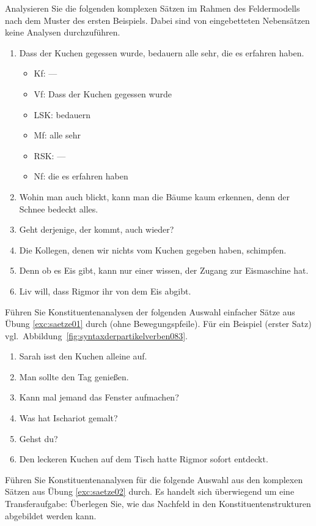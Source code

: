  \label{exc:saetze02} Analysieren Sie die folgenden komplexen Sätzen im Rahmen des Feldermodells nach dem Muster des ersten Beispiels.
Dabei sind von eingebetteten Nebensätzen keine Analysen durchzuführen.

\begin{enumerate}
  \item Dass der Kuchen gegessen wurde, bedauern alle sehr, die es erfahren haben.
    \begin{itemize}
      \item Kf: ---
      \item Vf: Dass der Kuchen gegessen wurde
      \item LSK: bedauern
      \item Mf: alle sehr
      \item RSK: ---
      \item Nf: die es erfahren haben
    \end{itemize}
  \item Wohin man auch blickt, kann man die Bäume kaum erkennen, denn der Schnee bedeckt alles.
  \item Geht derjenige, der kommt, auch wieder?
  \item Die Kollegen, denen wir nichts vom Kuchen gegeben haben, schimpfen.
  \item Denn ob es Eis gibt, kann nur einer wissen, der Zugang zur Eismaschine hat.
  \item Liv will, dass Rigmor ihr von dem Eis abgibt.
\end{enumerate}

 \label{exc:saetze03} Führen Sie Konstituentenanalysen der folgenden Auswahl einfacher Sätze aus Übung \ref{exc:saetze01} durch (ohne Bewegungspfeile).
Für ein Beispiel (erster Satz) vgl.\ Abbildung~\ref{fig:syntaxderpartikelverben083}.

\begin{enumerate}
  \item{Sarah isst den Kuchen alleine auf.}
  \item{Man sollte den Tag genießen.}
  \item{Kann mal jemand das Fenster aufmachen?}
  \item{Was hat Ischariot gemalt?}
  \item{Gehst du?}
  \item{Den leckeren Kuchen auf dem Tisch hatte Rigmor sofort entdeckt.}
\end{enumerate}

 \label{exc:saetze04} Führen Sie Konstituentenanalysen für die folgende Auswahl aus den komplexen Sätzen aus Übung \ref{exc:saetze02} durch.
Es handelt sich überwiegend um eine Transferaufgabe:
Überlegen Sie, wie das Nachfeld in den Konstituentenstrukturen abgebildet werden kann.


